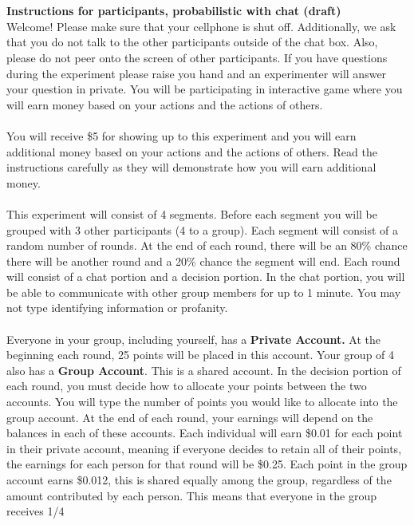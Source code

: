 \documentclass[11pt]{article}
\begin{document}
\\\\
\textbf{Instructions for participants, probabilistic with chat (draft)}\\
    Welcome! Please make sure that your cellphone is shut off. Additionally, we ask that you do not talk to the other participants outside of the chat box.
    Also, please do not peer onto the screen of other participants.
    If you have questions during the experiment please raise you hand and an experimenter will answer your question in private.
    You will be participating in interactive game where you will earn money based on your actions and the actions of others.
\\\\
    You will receive \$5 for showing up to this experiment and you will earn additional money based on your actions and the actions of others. 
    Read the instructions carefully as they will demonstrate how you will earn additional money.    
\\\\
    This experiment will consist of 4 segments. Before each segment you will be grouped with 3 other participants (4 to a group). Each segment will consist of a random number of rounds.
    At the end of each round, there will be an 80\% chance there will be another round and a 20\% chance the segment will end. Each round will consist of a chat portion and a decision portion.
    In the chat portion, you will be able to communicate with other group members for up to 1 minute. You may not type identifying information or profanity.\\\\
    Everyone in your group, including yourself, has a \textbf{Private Account.} At the beginning each round, 25 points will be placed in this account. Your group of 4 also has a \textbf{Group Account}.
   This is a shared account. In the decision portion of each round, you must decide how to allocate your points between the two accounts.
   You will type the number of points you would like to allocate into the group account. At the end of each round, your earnings will depend on the balances in each of these accounts.
   Each individual will earn \$0.01 for each point in their private account, meaning if everyone decides to retain all of their points, the earnings for each person for that round will be \$0.25.
   Each point in the group account earns \$0.012, this is shared equally among the group, regardless of the amount contributed by each person. This means that everyone in the group receives 1/4
\end{document}
